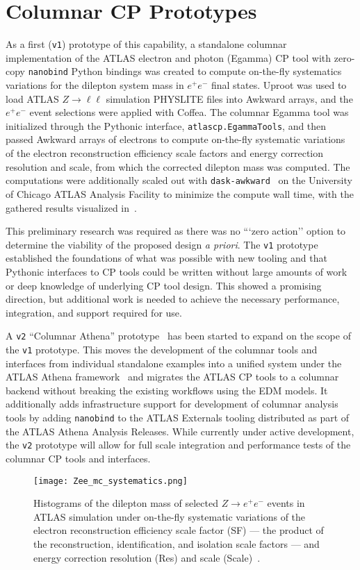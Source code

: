 \section{Columnar CP Prototypes}\label{sec:prototypes}

As a first (\texttt{v1}) prototype of this capability, a standalone columnar implementation of the ATLAS electron and photon (Egamma) CP tool with zero-copy \texttt{nanobind} Python bindings was created to compute on-the-fly systematics variations for the dilepton system mass in $e^{+}e^{-}$ final states.
Uproot was used to load ATLAS $Z\to \ell\ell$ simulation PHYSLITE files into Awkward arrays, and the $e^{+}e^{-}$ event selections were applied with Coffea.
The columnar Egamma tool was initialized through the Pythonic interface, \texttt{atlascp.EgammaTools}, and then passed Awkward arrays of electrons to compute on-the-fly systematic variations of the electron reconstruction efficiency scale factors and energy correction resolution and scale, from which the corrected dilepton mass was computed.
The computations were additionally scaled out with \texttt{dask-awkward}~\cite{dask_awkward_2024} on the University of Chicago ATLAS Analysis Facility to minimize the compute wall time, with the gathered results visualized in~.

This preliminary research was required as there was no ```zero action'' option to determine the viability of the proposed design \textit{a priori}.
The \texttt{v1} prototype established the foundations of what was possible with new tooling and that Pythonic interfaces to CP tools could be written without large amounts of work or deep knowledge of underlying CP tool design.
This showed a promising direction, but additional work is needed to achieve the necessary performance, integration, and support required for use.

A \texttt{v2} ``Columnar Athena'' prototype~\cite{columnar_athena} has been started to expand on the scope of the \texttt{v1} prototype.
This moves the development of the columnar tools and interfaces from individual standalone examples into a unified system under the ATLAS Athena framework~\cite{ATLAS_Athena} and migrates the ATLAS CP tools to a columnar backend without breaking the existing workflows using the EDM models.
It additionally adds infrastructure support for development of columnar analysis tools by adding \texttt{nanobind} to the ATLAS Externals tooling distributed as part of the ATLAS Athena Analysis Releases.
While currently under active development, the \texttt{v2} prototype will allow for full scale integration and performance tests of the columnar CP tools and interfaces.

\begin{figure}
    \centering
    \texttt{[image: Zee\_mc\_systematics.png]}
    \caption{Histograms of the dilepton mass of selected $Z\to e^{+}e^{-}$ events in ATLAS simulation under on-the-fly systematic variations of the electron reconstruction efficiency scale factor (SF) --- the product of the reconstruction, identification, and isolation scale factors --- and energy correction resolution (Res) and scale (Scale)~\cite{Vigl:ACAT_2024}.}
    \label{fig:Zee_mc_systematics}
\end{figure}
